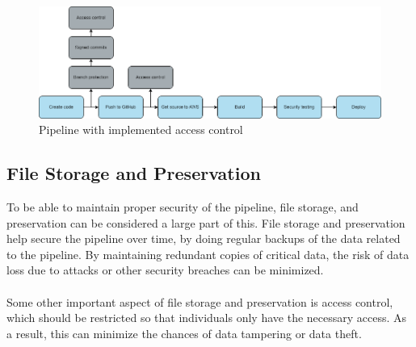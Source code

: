 \vspace{2mm}
\begin{figure}[H]
    \centering
    \includegraphics[width=0.8\columnwidth]{Images/pipeline7.png}
    \caption{Pipeline with implemented access control}
    \label{fig: Pipeline with implemented access control}
\end{figure}
 
\subsection{File Storage and Preservation}
To be able to maintain proper security of the pipeline, file storage, and preservation can be considered a large part of this. File storage and preservation help secure the pipeline over time, by doing regular backups of the data related to the pipeline. By maintaining redundant copies of critical data, the risk of data loss due to attacks or other security breaches can be minimized. 
\\~\\
Some other important aspect of file storage and preservation is access control, which should be restricted so that individuals only have the necessary access. As a result, this can minimize the chances of data tampering or data theft.

